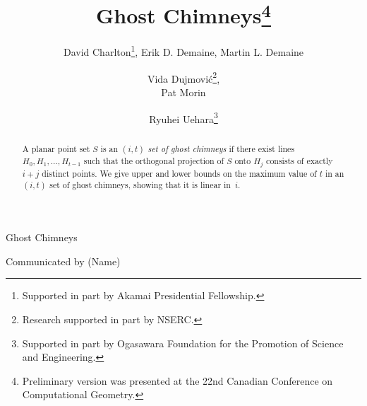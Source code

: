 \documentclass{ws-ijcga}
\begin{document}
{Ghost Chimneys}



\catchline

\title{Ghost Chimneys\footnote{Preliminary version was presented at the
22nd Canadian Conference on Computational Geometry.}}

\author{David Charlton\footnote{Supported in part by Akamai Presidential Fellowship.},
Erik D. Demaine,
Martin L. Demaine
}
%
\address{Computer Science and Artificial Intelligence Laboratory, MIT, Cambridge, USA.\\
\protect\url{{dchar,edemaine,mdemaine}@mit.edu}} 



\author{Vida Dujmovi\'c\footnote{Research supported in part by NSERC.},
\addtocounter{footnote}{-1}
Pat Morin\footnotemark%
}
%
\address{School of Computer Science, Carleton University, Ottawa, Canada.\\
\protect\url{{vida,morin}@scs.carleton.ca}} 


\author{Ryuhei Uehara\footnote{Supported in part by
Ogasawara Foundation for the Promotion of Science and Engineering.}}
%
\address{School of Information Science, JAIST, Ishikawa, Japan.\\
\protect\url{uehara@jaist.ac.jp}} 

\maketitle

{Communicated by (Name)}

\begin{abstract}
A planar point set $S$ is an $(i,t)$ \emph{set of ghost chimneys}
if there exist lines $H_0,H_1,\ldots,H_{t-1}$ such that the orthogonal
projection of $S$ onto $H_j$ consists of exactly $i+j$ distinct points.
We give upper and lower bounds on the maximum value of $t$
in an $(i,t)$ set of ghost chimneys, showing that it is linear in~$i$.

\end{abstract}
\end{document}

